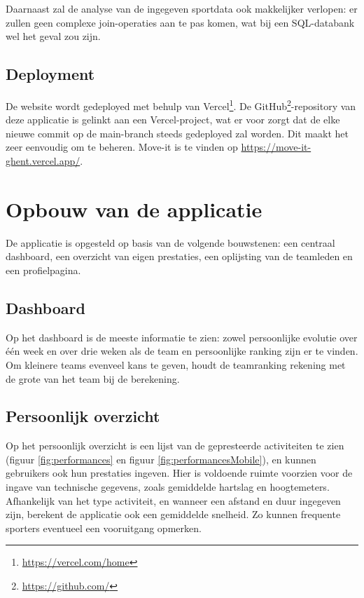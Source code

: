 Daarnaast zal de analyse van de ingegeven sportdata ook makkelijker verlopen: er zullen geen complexe join-operaties aan te pas komen, wat bij een SQL-databank wel het geval zou zijn.

\subsection{Deployment}

De website wordt gedeployed met behulp van Vercel\footnote{\href{https://vercel.com/home}{https://vercel.com/home}}. De GitHub\footnote{\href{https://github.com/}{https://github.com/}}-repository van deze applicatie is gelinkt aan een Vercel-project, wat er voor zorgt dat de elke nieuwe commit op de main-branch steeds gedeployed zal worden. Dit maakt het zeer eenvoudig om te beheren. Move-it is te vinden op \href{https://move-it-ghent.vercel.app/}{https://move-it-ghent.vercel.app/}.

\section{Opbouw van de applicatie}

De applicatie is opgesteld op basis van de volgende bouwstenen: een centraal dashboard, een overzicht van eigen prestaties, een oplijsting van de teamleden en een profielpagina.

\subsection{Dashboard}
Op het dashboard is de meeste informatie te zien: zowel persoonlijke evolutie over één week en over drie weken als de team en persoonlijke ranking zijn er te vinden. Om kleinere teams evenveel kans te geven, houdt de teamranking rekening met de grote van het team bij de berekening.

\subsection{Persoonlijk overzicht}
Op het persoonlijk overzicht is een lijst van de gepresteerde activiteiten te zien (figuur \ref{fig:performances} en figuur \ref{fig:performancesMobile}), en kunnen gebruikers ook hun prestaties ingeven. Hier is voldoende ruimte voorzien voor de ingave van technische gegevens, zoals gemiddelde hartslag en hoogtemeters. Afhankelijk van het type activiteit, en wanneer een afstand en duur ingegeven zijn, berekent de applicatie ook een gemiddelde snelheid. Zo kunnen frequente sporters eventueel een vooruitgang opmerken.

